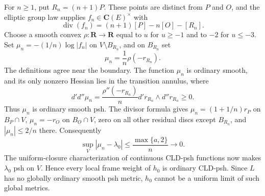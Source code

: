 For \(n\geq1\), put \(R_n=(n+1)P\).  These points are distinct from \(P\)
and \(O\), and the elliptic group law supplies \(f_n\in\mathbf C(E)^\times\)
with
\[
 \operatorname{div}(f_n)=(n+1)[P]-n[O]-[R_n].
\]
Choose a smooth convex \(\rho\colon\mathbf R\to\mathbf R\) equal to \(u\)
for \(u\geq-1\) and to \(-2\) for \(u\leq-3\).  Set
\(\mu_n=-(1/n)\log|f_n|\) on \(V\setminus B_{R_n}\), and on \(B_{R_n}\)
set
\[
 \mu_n=\frac1n\rho(-r_{R_n}).
\]
The definitions agree near the boundary.  The function \(\mu_n\) is
ordinary smooth, and its only nonzero Hessian lies in the transition
annulus, where
\[
 d'd''\mu_n=\frac{\rho''(-r_{R_n})}{n}
             d'r_{R_n}\wedge d''r_{R_n}\geq0.
\]
Thus \(\mu_n\) is ordinary smooth psh.  The divisor formula gives
\(\mu_n=(1+1/n)r_P\) on \(B_P\cap V\), \(\mu_n=-r_O\) on
\(B_O\cap V\), zero on all other residual discs except \(B_{R_n}\), and
\(|\mu_n|\leq2/n\) there.  Consequently
\[
  \sup_V|\mu_n-\lambda_0|\leq\frac{\max\{a,2\}}n\longrightarrow0.
\]
The uniform-closure characterization of continuous CLD-psh functions now
makes \(\lambda_0\) psh on \(V\).  Hence every local frame weight of
\(h_0\) is ordinary CLD-psh.  Since \(L\) has no globally ordinary smooth
psh metric, \(h_0\) cannot be a uniform limit of such global metrics.
